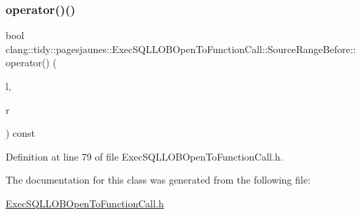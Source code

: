 \subsubsection{\texorpdfstring{operator()()}{operator()()}}
{\footnotesize\ttfamily bool clang\+::tidy\+::pagesjaunes\+::\+Exec\+S\+Q\+L\+L\+O\+B\+Open\+To\+Function\+Call\+::\+Source\+Range\+Before\+::operator() (\begin{DoxyParamCaption}\item[{const \hyperlink{classclang_1_1tidy_1_1pagesjaunes_1_1_exec_s_q_l_l_o_b_open_to_function_call_1_1_source_range_for_string_literals}{Source\+Range\+For\+String\+Literals} \&}]{l,  }\item[{const \hyperlink{classclang_1_1tidy_1_1pagesjaunes_1_1_exec_s_q_l_l_o_b_open_to_function_call_1_1_source_range_for_string_literals}{Source\+Range\+For\+String\+Literals} \&}]{r }\end{DoxyParamCaption}) const\hspace{0.3cm}{\ttfamily [inline]}}



Definition at line 79 of file Exec\+S\+Q\+L\+L\+O\+B\+Open\+To\+Function\+Call.\+h.



The documentation for this class was generated from the following file\+:\begin{DoxyCompactItemize}
\item 
\hyperlink{_exec_s_q_l_l_o_b_open_to_function_call_8h}{Exec\+S\+Q\+L\+L\+O\+B\+Open\+To\+Function\+Call.\+h}\end{DoxyCompactItemize}
